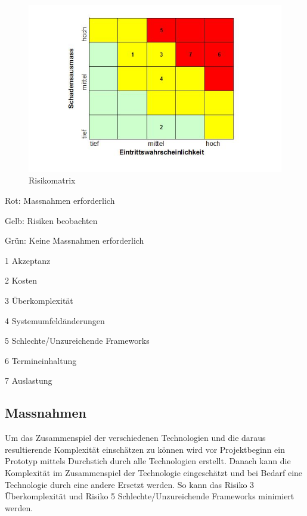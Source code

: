\begin{figure}[htbp]
\centering
\includegraphics{images/excel-statistik/risikomatrix.JPG}
\caption[Risikomatrix ]{Risikomatrix \footnotemark{}}
\end{figure}

Rot: Massnahmen erforderlich

Gelb: Risiken beobachten

Grün: Keine Massnahmen erforderlich

1 Akzeptanz

2 Kosten

3 Überkomplexität

4 Systemumfeldänderungen

5 Schlechte/Unzureichende Frameworks

6 Termineinhaltung

7 Auslastung

\subsection{Massnahmen}\label{massnahmen}

Um das Zusammenspiel der verschiedenen Technologien und die daraus
resultierende Komplexität einschätzen zu können wird vor Projektbeginn
ein Prototyp mittels Durchstich durch alle Technologien erstellt. Danach
kann die Komplexität im Zusammenspiel der Technologie eingeschätzt und
bei Bedarf eine Technologie durch eine andere Ersetzt werden. So kann
das Risiko 3 Überkomplexität und Risiko 5 Schlechte/Unzureichende
Frameworks minimiert werden.

